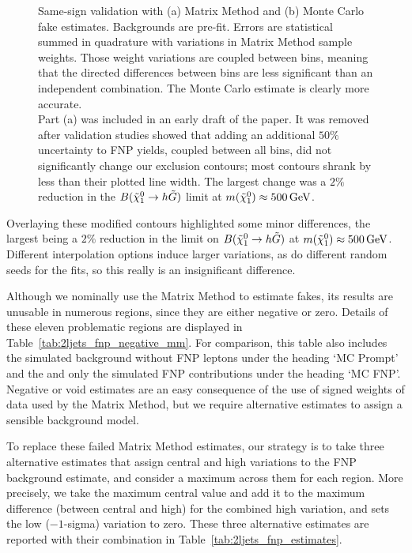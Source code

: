 \begin{figure}[tp]
\begin{subfigure}{0.48\textwidth}
\caption{}
\label{fig:2ljets_vrss_mc}
\end{subfigure}
\caption[
Same-sign validation with Matrix Method and Monte Carlo fake estimates
]{%
Same-sign validation with (a) Matrix Method and (b) Monte Carlo fake estimates.
Backgrounds are pre-fit.
Errors are statistical summed in quadrature with variations in Matrix Method
sample weights.
Those weight variations are coupled between bins, meaning that the
directed differences between bins are less significant than an independent
combination.
The Monte Carlo estimate is clearly more accurate.
\\[0.5em]
Part (a) was included in an early draft of the paper.
It was removed after validation studies showed that adding an additional
$50\%$ uncertainty to FNP yields, coupled between all bins, did not
significantly change our exclusion contours;
most contours shrank by less than their plotted line width.
The largest change was a $2\%$ reduction in the
$B(\neutralino_1 \rightarrow h \gravitino)$
limit at $m(\neutralino_1) \approx 500\,\eV[G]$.
}
\label{fig:2ljets_vrss}
\end{figure}

Overlaying these modified contours highlighted some minor differences, the
largest being a $2\%$ reduction in the limit on
$B(\neutralino_1 \rightarrow h \gravitino)$ at
$m(\neutralino_1) \approx 500\,\eV[G]$.
Different interpolation options induce larger variations, as do different
random seeds for the fits, so this really is an insignificant difference.

Although we nominally use the Matrix Method to estimate fakes, its results
are unusable in numerous regions, since they are either negative or zero.
Details of these eleven problematic regions are displayed in
Table~\ref{tab:2ljets_fnp_negative_mm}.
For comparison, this table also includes the simulated background without
FNP leptons under the heading `MC Prompt' and the and only
the simulated FNP contributions under the heading `MC FNP'.
Negative or void estimates are an easy consequence of the use of signed
weights of data used by the Matrix Method, but we require alternative
estimates to assign a sensible background model.

To replace these failed Matrix Method estimates, our strategy is to take three
alternative estimates that assign central and high variations to the
FNP background estimate, and consider a maximum across them for
each region.
More precisely, we take the maximum central value and add it to the maximum
difference (between central and high) for the combined high variation, and
sets the low ($-1$-sigma) variation to zero.
These three alternative estimates are reported with their combination in
Table~\ref{tab:2ljets_fnp_estimates}.

